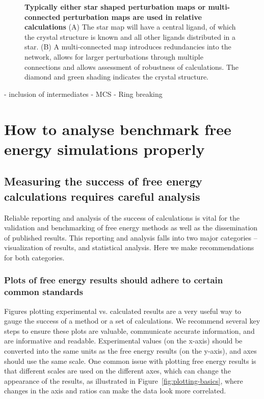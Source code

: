 \documentclass[9pt,bestpractices]{livecoms}
\begin{document}
\begin{figure}
    \caption{\textbf{Typically either star shaped perturbation maps or multi-connected perturbation maps are used in relative calculations} (A) The star map will have a central ligand, of which the crystal structure is known and all other ligands distributed in a star. (B) A multi-connected map introduces redundancies into the network, allows for larger perturbations through multiple connections and allows assessment of robustness of calculations. The diamond and green shading indicates the crystal structure.}
    \label{fig:map}
\end{figure}

- inclusion of intermediates
- MCS
- Ring breaking


\section{How to analyse benchmark free energy simulations properly}
\label{sec:analysis}

\subsection{Measuring the success of free energy calculations requires careful analysis}

Reliable reporting and analysis of the success of calculations is vital for the validation and benchmarking of free energy methods as well as the dissemination of published results. This reporting and analysis falls into two major categories -- visualization of results, and statistical analysis. Here we make recommendations for both categories.

\subsubsection{Plots of free energy results should adhere to certain common standards}
\label{sec:plotting_results}
Figures plotting experimental vs. calculated results are a very useful way to gauge the success of a method or a set of calculations. We recommend several key steps to ensure these plots are valuable, communicate accurate information, and are informative and readable. Experimental values (on the x-axis) should be converted into the same units as the free energy results (on the y-axis), and axes should use the same scale. One common issue with plotting free energy results is that different scales are used on the different axes, which can change the appearance of the results, as illustrated in Figure~\ref{fig:plotting-basics}, where changes in the axis and ratios can make the data look more correlated.
\end{document}
